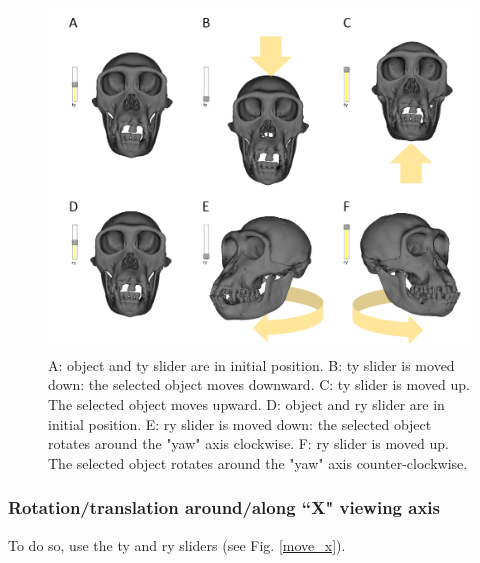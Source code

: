 \begin{figure}
  \centering
  \includegraphics[scale=0.45]{images/06/objects/move_objects_y.png} 
	\caption{A: object and ty slider are in initial position. B: ty slider is moved down: the selected object moves downward. C: ty slider is moved up. The selected object moves upward. D: object and ry slider are in initial position. E: ry slider is moved down: the selected object rotates around the "yaw" axis clockwise. F: ry slider is moved up. The selected object rotates around the "yaw" axis counter-clockwise.}
\label{move_y}
 
\end{figure}



\subsubsection{Rotation/translation around/along ``X" viewing axis}

To do so, use the ty and ry sliders (see Fig. \ref{move_x}).

